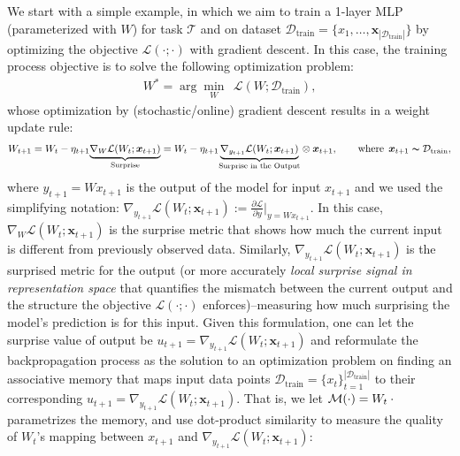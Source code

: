 We start with a simple example, in which we aim to train a 1-layer MLP (parameterized with $W$) for task $\mathcal{T}$ and on dataset $\mathcal{D}_{\text{train}} = \{x_1, \dots, \boldsymbol{x}_{|\mathcal{D}_{\text{train}}|}\}$ by optimizing the objective $\mathcal{L}(\cdot; \cdot)$ with gradient descent. In this case, the training process objective is to solve the following optimization problem:
\begin{align}\label{eq:example1}
    W^{*} = \arg\min_{W} \:\: \mathcal{L}(W; \mathcal{D}_{\text{train}}), 
\end{align}
whose optimization by (stochastic/online) gradient descent results in a weight update rule:
\begin{align}\label{eq:gradient-dual}
    W_{t+1} = W_{t} - \eta_{t+1} \underset{\text{Surprise}}{\underbrace{\nabla_{W} \mathcal{L}(W_t; \boldsymbol{x}_{t+1})}} = W_{t} - \eta_{t+1} \underset{\text{Surprise in the Output}}{\underbrace{\nabla_{y_{t+1}} \mathcal{L}(W_t; \boldsymbol{x}_{t+1})}} \otimes \boldsymbol{x}_{t+1}, \qquad \text{where}\:\: \boldsymbol{x}_{t+1} \thicksim \mathcal{D}_{\text{train}},
\end{align}
where $y_{t+1}=Wx_{t+1}$ is the output of the model for input $x_{t+1}$ and we used the simplifying notation: $\nabla_{y_{t+1}} \mathcal{L}(W_t; \boldsymbol{x}_{t+1}):= \frac{\partial \mathcal{L}}{\partial y}|_{y = W x_{t+1}}$.  In this case, $\nabla_{W} \mathcal{L}(W_t; \boldsymbol{x}_{t+1})$ is the surprise metric that shows how much the current input is different from previously observed data. Similarly, $\nabla_{y_{t+1}} \mathcal{L}(W_t; \boldsymbol{x}_{t+1})$ is the surprised metric for the output (or more accurately \emph{local surprise signal in representation space} that quantifies the mismatch between the current output and the structure the objective $\mathcal{L}(\cdot; \cdot)$ enforces)–measuring how much surprising the model's prediction is for this input. Given this formulation, one can let the surprise value of output be $u_{t+1} = \nabla_{y_{t+1}} \mathcal{L}(W_t; \boldsymbol{x}_{t+1})$ and reformulate the backpropagation process {as the solution to an optimization problem} on finding an  associative memory that maps input data points $\mathcal{D}_{\text{train}} = \{x_t\}_{t=1}^{|\mathcal{D}_{\text{train}}|}$ to their corresponding $u_{t+1} = \nabla_{y_{t+1}} \mathcal{L}(W_t; \boldsymbol{x}_{t+1})$. That is, we let $\mathcal{M}(\cdot) = W_t \: \cdot$ parametrizes the memory, and use dot-product similarity to measure the quality of $W_t$'s mapping between $x_{t+1}$ and $\nabla_{y_{t+1}} \mathcal{L}(W_t; \boldsymbol{x}_{t+1})$:
